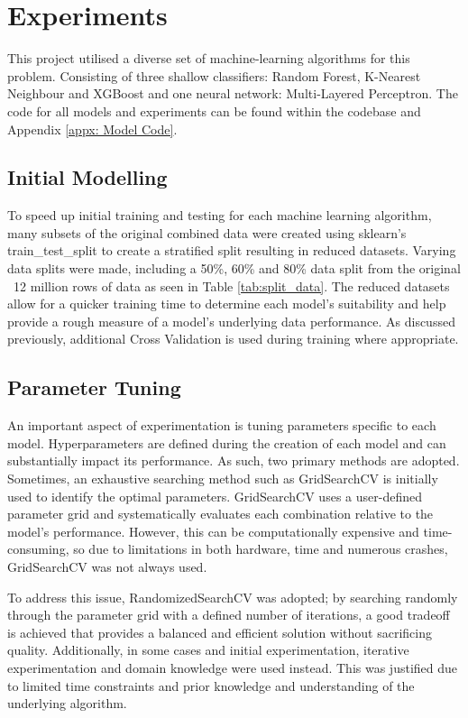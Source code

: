 
\section{Experiments}
\label{sec: Experiments}

This project utilised a diverse set of machine-learning algorithms for this problem. Consisting of three shallow classifiers: Random Forest, K-Nearest Neighbour and XGBoost and one neural network: Multi-Layered Perceptron. The code for all models and experiments can be found within the codebase and Appendix \ref{appx: Model Code}.

\subsection{Initial Modelling}
To speed up initial training and testing for each machine learning algorithm, many subsets of the original combined data were created using sklearn's train\_test\_split to create a stratified split resulting in reduced datasets. Varying data splits were made, including a 50\%, 60\% and 80\% data split from the original ~12 million rows of data as seen in Table \ref{tab:split_data}. The reduced datasets allow for a quicker training time to determine each model's suitability and help provide a rough measure of a model's underlying data performance. As discussed previously, additional Cross Validation is used during training where appropriate.

\subsection{Parameter Tuning} 
An important aspect of experimentation is tuning parameters specific to each model. Hyperparameters are defined during the creation of each model and can substantially impact its performance. As such, two primary methods are adopted. Sometimes, an exhaustive searching method such as GridSearchCV is initially used to identify the optimal parameters. GridSearchCV uses a user-defined parameter grid and systematically evaluates each combination relative to the model's performance. However, this can be computationally expensive and time-consuming, so due to limitations in both hardware, time and numerous crashes, GridSearchCV was not always used. 

\smallskip

To address this issue, RandomizedSearchCV was adopted; by searching randomly through the parameter grid with a defined number of iterations, a good tradeoff is achieved that provides a balanced and efficient solution without sacrificing quality. Additionally, in some cases and initial experimentation, iterative experimentation and domain knowledge were used instead. This was justified due to limited time constraints and prior knowledge and understanding of the underlying algorithm. 

